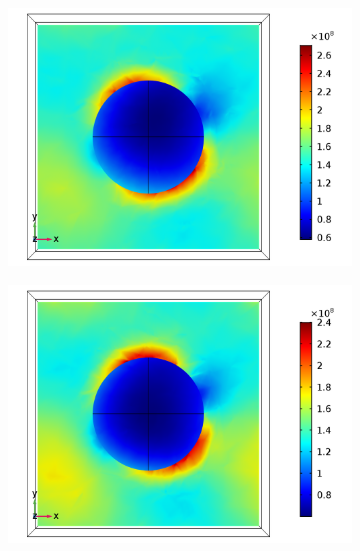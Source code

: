 \begin{figure}[htb!]  
    \begin{subfigure}{0.32\textwidth}    %
        \centering
        \includegraphics[width=\linewidth]{figures/ch4/S5A/FieldDistribution/phi25/z2/Sample5A_TE_Slice@z=+05Rz_wl=230_phi=25.png}
   \end{subfigure}
   \begin{subfigure}{0.32\textwidth}
        \centering
        \includegraphics[width=\linewidth]{figures/ch4/S5A/FieldDistribution/phi25/z2/Sample5A_TE_Slice@z=+05Rz_wl=255_phi=25.png}
   \end{subfigure}
   \begin{subfigure}{0.32\textwidth}

\end{subfigure}
\end{figure}
